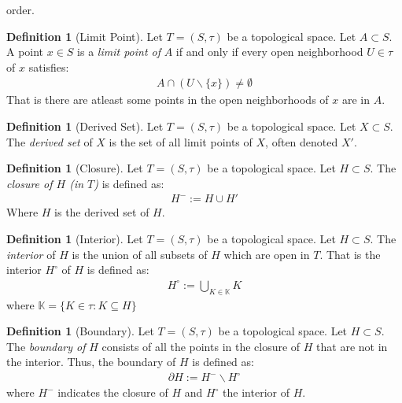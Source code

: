 \documentclass{article}
\theoremstyle{plain}
\theoremstyle{definition}
\newtheorem{definition}[theorem]{Definition}
\newcommand{\del}{\partial}
\begin{document}
order.
\begin{definition}[Limit Point]
	Let $T=(S,\tau)$ be a topological space. Let $A\subset S$. A point $x\in S$
	is a \textit{limit point of} $A$ if and only if every open neighborhood
	$U\in\tau$ of $x$ satisfies:
	\begin{equation}
	\begin{aligned}
		A\cap (U\backslash \{x\})\neq\emptyset
	\end{aligned}
	\end{equation}
	That is there are atleast some points in the open neighborhoods
	of $x$ are in $A$.
\end{definition}
\begin{definition}[Derived Set]
	Let $T=(S,\tau)$ be a topological space. Let $X\subset S$. 
	The \textit{derived set} of $X$ is the set of all limit points of $X$,
	often denoted $X'$.
\end{definition}
\begin{definition}[Closure]
	Let $T=(S,\tau)$ be a topological space. Let $H\subset S$. 
	The \textit{closure of $H$ (in $T$)} is defined as:
	\begin{equation}
	\begin{aligned}
		H^-:=H\cup H'
	\end{aligned}
	\end{equation}
	Where $H$ is the derived set of $H$.
\end{definition}
\begin{definition}[Interior]
	Let $T=(S,\tau)$ be a topological space. Let $H\subset S$. 
	The \textit{interior} of $H$ is the union of all subsets of $H$ which are
	open in $T$. That is the interior $H^\circ$ of $H$ is defined as:
	\begin{equation}
	\begin{aligned}
		H^\circ:=\bigcup_{K\in\mathbb{K}} K
	\end{aligned}
	\end{equation}
	where $\mathbb{K}=\{K\in\tau:K\subseteq H\}$
\end{definition}
\begin{definition}[Boundary]
	Let $T=(S,\tau)$ be a topological space. Let $H\subset S$. 
	The \textit{boundary of} $H$ consists of all the points in the closure of
	$H$ that are not in the interior. Thus, the boundary of $H$ is defined as:
	\begin{equation}
	\begin{aligned}
		\del H := H^-\backslash H^\circ
	\end{aligned}
	\end{equation}
	where $H^-$ indicates the closure of $H$ and $H^\circ$ the interior of $H$.
\end{definition}
\newpage
\end{document}
